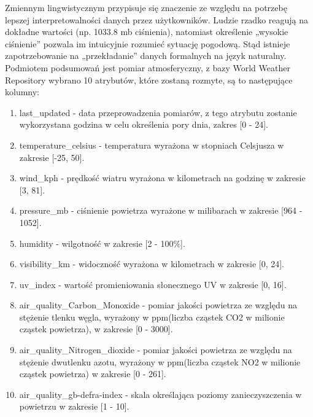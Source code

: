 \documentclass{article}
\begin{document}
Zmiennym lingwistycznym przypisuje się znaczenie ze względu na potrzebę lepszej interpretowalności danych przez użytkowników. Ludzie rzadko reagują na dokładne wartości (np. 1033.8 mb ciśnienia), natomiast określenie „wysokie ciśnienie” pozwala im intuicyjnie rozumieć sytuację pogodową. Stąd istnieje zapotrzebowanie na „przekładanie” danych formalnych na język naturalny. \\
Podmiotem podsumowań jest pomiar atmosferyczny, z bazy World Weather Repository wybrano 10 atrybutów, które zostaną rozmyte, są to następujące kolumny:
\begin{enumerate}
    \item last\_updated - data przeprowadzenia pomiarów, z tego atrybutu zostanie wykorzystana godzina w celu określenia pory dnia, zakres [0 - 24]. 
    \item temperature\_celsius - temperatura wyrażona w stopniach Celsjusza w zakresie [-25, 50].
    \item wind\_kph - prędkość wiatru wyrażona w kilometrach na godzinę w zakresie [3, 81]. 
    \item pressure\_mb - ciśnienie powietrza wyrażone w milibarach w zakresie [964 - 1052]. 
    \item humidity - wilgotność w zakresie [2 - 100\%].
    \item visibility\_km - widoczność wyrażona w kilometrach w zakresie [0, 24].
    \item uv\_index - wartość promieniowania słonecznego UV w zakresie [0, 16].
    \item air\_quality\_Carbon\_Monoxide - pomiar jakości powietrza ze względu na stężenie tlenku węgla, wyrażony w ppm(liczba cząstek CO2 w milionie cząstek powietrza), w zakresie [0 - 3000].
    \item air\_quality\_Nitrogen\_dioxide - pomiar jakości powietrza ze względu na stężenie dwutlenku azotu, wyrażony w ppm(liczba cząstek NO2 w milionie cząstek powietrza) w zakresie [0 - 261].
    \item air\_quality\_gb-defra-index - skala określająca poziomy zanieczyszczenia w powietrzu w zakresie [1 - 10].

    
\end{enumerate}
\end{document}
